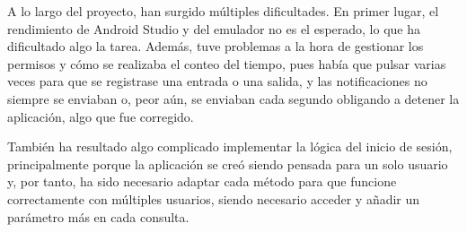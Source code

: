 A lo largo del proyecto, han surgido múltiples dificultades. En primer lugar, el rendimiento de Android Studio y del emulador no es el esperado, lo que ha dificultado algo la tarea. Además, tuve problemas a la hora de gestionar los permisos y cómo se realizaba el conteo del tiempo, pues había que pulsar varias veces para que se registrase una entrada o una salida, y las notificaciones no siempre se enviaban o, peor aún, se enviaban cada segundo obligando a detener la aplicación, algo que fue corregido.

También ha resultado algo complicado implementar la lógica del inicio de sesión, principalmente porque la aplicación se creó siendo pensada para un solo usuario y, por tanto, ha sido necesario adaptar cada método para que funcione correctamente con múltiples usuarios, siendo necesario acceder y añadir un parámetro más en cada consulta.